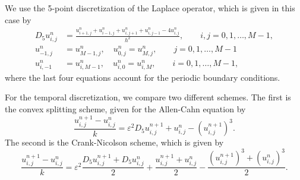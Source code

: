 \documentclass{article}
\begin{document}
	We use the 5-point discretization of the Laplace operator, which is given in this case by
	\begin{align}
		D_5u^n_{i,j} &= \frac{u^n_{i+1,j} + u^n_{i-1,j} + u^n_{i,j+1} + u^n_{i,j-1} - 4u^n_{i,j}}{h^2},\qquad i, j = 0,1,\dots, M-1, \\
		u^n_{-1,j} &= u^n_{M-1,j},\quad u^n_{0,j} = u^n_{M,j}, \qquad j = 0,1,\dots, M-1\\
		u^n_{i,-1} &= u^n_{i,M-1}, \quad u^n_{i,0} = u^n_{i,M}, \qquad i= 0,1,\dots, M-1,
	\end{align}
	where the last four equations account for the periodic boundary conditions.
	
	For the temporal discretization, we compare two different schemes. The first is the convex splitting scheme, given for the Allen-Cahn equation by
	\begin{equation}
		\frac{u^{n+1}_{i,j} - u^n_{i,j}}{k} = \varepsilon^2D_5u^{n+1}_{i,j} + u^n_{i,j} - \left(u^{n+1}_{i,j}\right)^3.
	\end{equation}
	The second is the Crank-Nicolson scheme, which is given by
	\begin{equation}
		\frac{u^{n+1}_{i,j} - u^n_{i,j}}{k} = \varepsilon^2\frac{D_5u^{n+1}_{i,j} + D_5u^n_{i,j}}{2} + \frac{u^{n+1}_{i,j} + u^n_{i,j}}{2} - \frac{\left(u^{n+1}_{i,j}\right)^3 + \left(u^n_{i,j}\right)^3}{2}.
	\end{equation}
	
\end{document}
